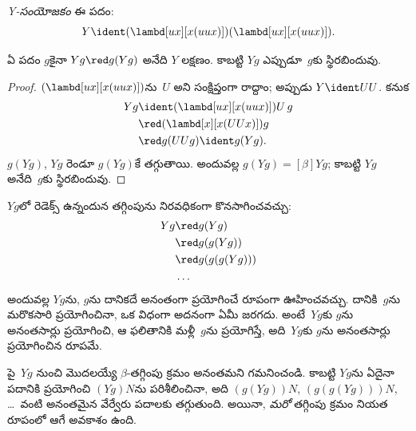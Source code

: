 \documentclass[../../../include/open-logic-section]{subfiles}
\begin{document}
\begin{defn}
  \emph{Y-సంయోజకం} ఈ పదం:
  \[
  Y \ident (\lambd[ux][x(uux)])(\lambd[ux][x(uux)]).
  \]
\end{defn}

\begin{thm}
  ఏ పదం $g$కైనా $Yg \red g(Yg)$ అనేది $Y$ లక్షణం.
  కాబట్టి $Yg$ ఎప్పుడూ~$g$కు స్థిరబిందువు.
\end{thm}

\begin{proof}
  $(\lambd[ux][x(uux)])$ను~$U$ అని సంక్షిప్తంగా రాద్దాం;
  అప్పుడు $Y \ident UU$. కనుక
  \begin{align*}
    Y g &\ident (\lambd[ux][x(uux)])U\,g \\
    &\red (\lambd[x][x(UUx)])g\\
    & \red g(UUg) \ident g(Yg).
  \end{align*}
  $g(Yg)$, $Yg$ రెండూ $g(Yg)$కే తగ్గుతాయి. అందువల్ల
  $g(Yg) \equal[\beta] Yg$; కాబట్టి $Yg$ అనేది~$g$కు
  స్థిరబిందువు.
\end{proof}

$Yg$లో రెడెక్స్ ఉన్నందున తగ్గింపును నిరవధికంగా
కొనసాగించవచ్చు:
\begin{align*}
  Y g &\red g (Y g) \\
    &\red g (g (Y g)) \\
    &\red g(g (g (Y g)))\\
    &\ldots
\end{align*}
అందువల్ల $Yg$ను, $g$ను దానికదే అనంతంగా ప్రయోగించే రూపంగా
ఊహించవచ్చు. దానికి~$g$ను మరొకసారి ప్రయోగించినా,
ఒక విధంగా అదనంగా ఏమీ జరగదు. అంటే~$Yg$కు $g$ను
అనంతసార్లు ప్రయోగించి, ఆ ఫలితానికి మళ్లీ~$g$ను
ప్రయోగిస్తే, అది~$Yg$కు $g$ను అనంతసార్లు ప్రయోగించిన రూపమే.

పై~$Yg$ నుంచి మొదలయ్యే $\beta$-తగ్గింపు క్రమం
అనంతమని గమనించండి. కాబట్టి $Yg$ను ఏదైనా పదానికి
ప్రయోగించి $(Yg)N$ను పరిశీలించినా, అది
$(g(Yg))N$, $(g(g(Yg)))N$, \dots\ వంటి అనంతమైన
వేర్వేరు పదాలకు తగ్గుతుంది. అయినా, \emph{మరో}
తగ్గింపు క్రమం నియత రూపంలో ఆగే అవకాశం ఉంది.
\end{document}
